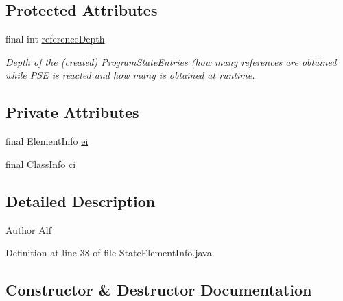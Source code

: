 \subsection*{Protected Attributes}
\begin{DoxyCompactItemize}
\item 
final int \hyperlink{classgov_1_1nasa_1_1jpf_1_1inspector_1_1server_1_1programstate_1_1_state_node_a55683618625dae46e8aa68d95811d6bb}{reference\+Depth}
\begin{DoxyCompactList}\small\item\em Depth of the (created) Program\+State\+Entries (how many references are obtained while P\+SE is reacted and how many is obtained at runtime. \end{DoxyCompactList}\end{DoxyCompactItemize}
\subsection*{Private Attributes}
\begin{DoxyCompactItemize}
\item 
final Element\+Info \hyperlink{classgov_1_1nasa_1_1jpf_1_1inspector_1_1server_1_1programstate_1_1_state_element_info_a8ab89d35f66b04255ccd81a976cf5a63}{ei}
\item 
final Class\+Info \hyperlink{classgov_1_1nasa_1_1jpf_1_1inspector_1_1server_1_1programstate_1_1_state_element_info_acdd8034996961333e13ef1821a8f5cbf}{ci}
\end{DoxyCompactItemize}


\subsection{Detailed Description}
\begin{DoxyAuthor}{Author}
Alf 
\end{DoxyAuthor}


Definition at line 38 of file State\+Element\+Info.\+java.



\subsection{Constructor \& Destructor Documentation}
